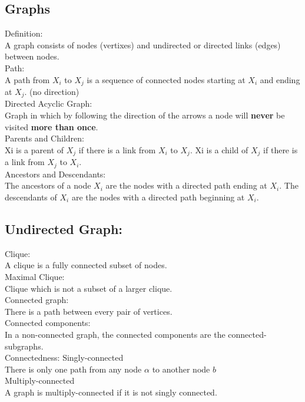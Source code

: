 \documentclass[12pt,a4paper]{article}
\begin{document}
\subsection*{Graphs}
{\large Definition:}\\
A graph consists of nodes (vertixes) and undirected or directed links (edges) between nodes.\\
{\large Path:}\\
A path from $X_i$ to $X_j$ is a sequence of connected nodes starting at $X_i$ and ending at $X_j$. (no direction)\\
{\large Directed Acyclic Graph:}\\
Graph in which by following the direction of the arrows a node will \textbf{never} be visited \textbf{more than once}.\\
{\large Parents and Children:}\\
Xi is a parent of $X_j$ if there is a link from $X_i$ to $X_j$. Xi is a child of $X_j$ if there is a link from $X_j$ to $X_i$.\\
{\large Ancestors and Descendants:}\\
The ancestors of a node $X_i$ are the nodes with a directed path ending at $X_i$. The descendants of $X_i$ are the nodes with a directed path beginning at $X_i$.\\
\subsection*{Undirected Graph:}
{\large Clique:}\\
A clique is a fully connected subset of nodes.\\
{\large Maximal Clique:}\\
Clique which is not a subset of a larger clique.\\
{\large Connected graph:}\\
There is a path between every pair of vertices.\\
{\large Connected components:}\\
In a non-connected graph, the connected components are the connected-subgraphs.\\
{\large Connectedness: Singly-connected}\\
There is only one path from any node $\alpha$ to another node $b$\\
{\large Multiply-connected}\\
A graph is multiply-connected if it is not singly connected.\\
\end{document}
